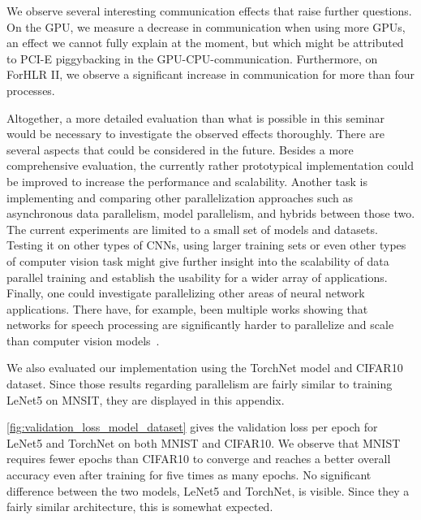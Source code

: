 \documentclass[conference]{IEEEtran}
\begin{document}
We observe several interesting communication effects that raise further questions.
On the GPU, we measure a decrease in communication when using more GPUs, an effect we cannot fully explain at the moment, but which might be attributed to PCI-E piggybacking in the GPU-CPU-communication.
Furthermore, on ForHLR II, we observe a significant increase in communication for more than four processes.

Altogether, a more detailed evaluation than what is possible in this seminar would be necessary to investigate the observed effects thoroughly.
There are several aspects that could be considered in the future.
Besides a more comprehensive evaluation, the currently rather prototypical implementation could be improved to increase the performance and scalability.
Another task is implementing and comparing other parallelization approaches such as asynchronous data parallelism, model parallelism, and hybrids between those two.
%
The current experiments are limited to a small set of models and datasets.
Testing it on other types of CNNs, using larger training sets or even other types of computer vision task might give further insight into the scalability of data parallel training and establish the usability for a wider array of applications.
%
Finally, one could investigate parallelizing other areas of neural network applications.
There have, for example, been multiple works showing that networks for speech processing are significantly harder to parallelize and scale than computer vision models~\cite{seide2014-Speech-DNNs,seide2014-1-bit-stochastic,dean2012-Large-scale-distributed}.








We also evaluated our implementation using the TorchNet model and CIFAR10 dataset.
Since those results regarding parallelism are fairly similar to training LeNet5 on MNSIT, they are displayed in this appendix.

\autoref{fig:validation_loss_model_dataset} gives the validation loss per epoch for LeNet5 and TorchNet on both MNIST and CIFAR10.
We observe that MNIST requires fewer epochs than CIFAR10 to converge and reaches a better overall accuracy even after training for five times as many epochs.
No significant difference between the two models, LeNet5 and TorchNet, is visible.
Since they a fairly similar architecture, this is somewhat expected.
\end{document}
